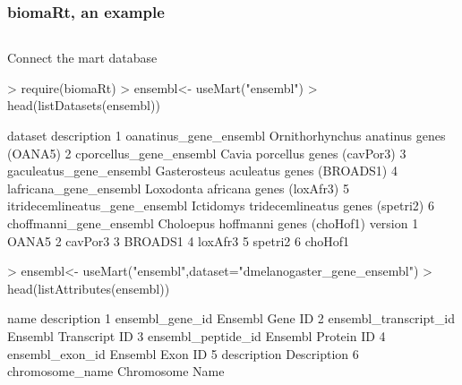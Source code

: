 \documentclass{beamer}
\begin{document}
\begin{frame}[fragile]
\frametitle{biomaRt, an example}
\begin{column}{1\textwidth}
  \bit
      \item Connect the mart database
          \begin{uncoverenv}
\begin{Schunk}
\begin{Sinput}
> require(biomaRt)
> ensembl<- useMart("ensembl")
> head(listDatasets(ensembl))
\end{Sinput}
\begin{Soutput}
                         dataset                                description
1         oanatinus_gene_ensembl     Ornithorhynchus anatinus genes (OANA5)
2        cporcellus_gene_ensembl            Cavia porcellus genes (cavPor3)
3        gaculeatus_gene_ensembl     Gasterosteus aculeatus genes (BROADS1)
4         lafricana_gene_ensembl         Loxodonta africana genes (loxAfr3)
5 itridecemlineatus_gene_ensembl Ictidomys tridecemlineatus genes (spetri2)
6        choffmanni_gene_ensembl        Choloepus hoffmanni genes (choHof1)
  version
1   OANA5
2 cavPor3
3 BROADS1
4 loxAfr3
5 spetri2
6 choHof1
\end{Soutput}
\begin{Sinput}
> ensembl<- useMart("ensembl",dataset="dmelanogaster_gene_ensembl")
> head(listAttributes(ensembl))
\end{Sinput}
\begin{Soutput}
                   name           description
1       ensembl_gene_id       Ensembl Gene ID
2 ensembl_transcript_id Ensembl Transcript ID
3    ensembl_peptide_id    Ensembl Protein ID
4       ensembl_exon_id       Ensembl Exon ID
5           description           Description
6       chromosome_name       Chromosome Name
\end{Soutput}
\end{Schunk}
          \end{uncoverenv}   
  \eit
\end{column}
\end{frame}

\end{document}
